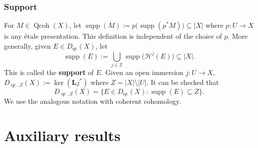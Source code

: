 \documentclass[11pt]{amsart}
\theoremstyle{plain}
\theoremstyle{definition}
\numberwithin{equation}{section}
\numberwithin{theorem}{section}
\begin{document}
\subsubsection{Support}
\label{sec:prelim_stacks_support}

For $M \in \operatorname{Qcoh}(X)$, let $\operatorname{supp}(M) := p\big(\operatorname{supp}(p^\ast M)\big) \subseteq |X|$ where $p \colon U \to X$ is any \'{e}tale presentation. 
This definition is independent of the choice of $p$. 
More generally, given $E \in D_{\operatorname{qc}}(X)$, let
\begin{displaymath}
    \operatorname{supp}(E) := \bigcup_{j \in \mathbb{Z}} \operatorname{supp}\big(\mathcal{H}^j(E)\big) \subseteq |X|.
\end{displaymath}
This is called the \textbf{support} of $E$. 
Given an open immersion $j\colon U \to X$, $D_{\operatorname{qc},Z}(X):=\ker (\mathbf{L}j^\ast)$ where $Z=|X|\setminus |U|$. 
It can be checked that
\begin{displaymath}
    D_{\operatorname{qc},Z}(X) = \{ E \in D_{\operatorname{qc}}(X) : \operatorname{supp}(E)\subseteq Z \}.
\end{displaymath}
We use the analogous notation with coherent cohomology.

\section{Auxiliary results}
\label{sec:auxillary}
\end{document}
